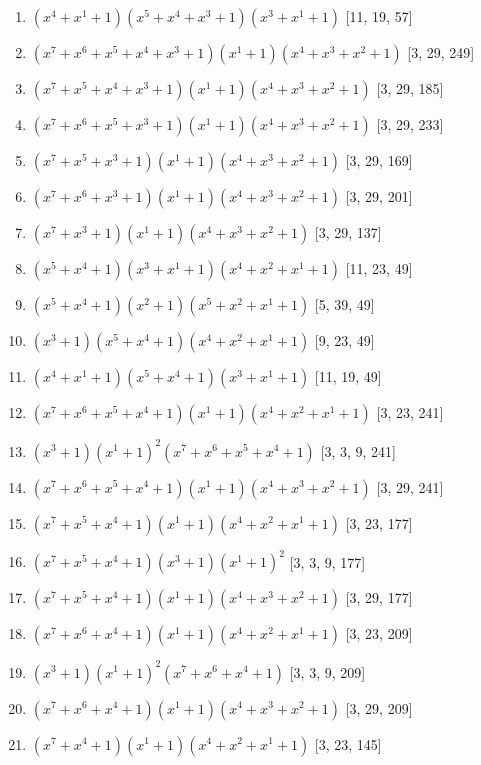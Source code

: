 \documentclass[10pt,twocolumn]{article}
\begin{document}
\begin{enumerate}
\item $(x^{4} + x^{1} + 1)(x^{5} + x^{4} + x^{3} + 1)(x^{3} + x^{1} + 1)$  [11, 19, 57]
\item $(x^{7} + x^{6} + x^{5} + x^{4} + x^{3} + 1)(x^{1} + 1)(x^{4} + x^{3} + x^{2} + 1)$  [3, 29, 249]
\item $(x^{7} + x^{5} + x^{4} + x^{3} + 1)(x^{1} + 1)(x^{4} + x^{3} + x^{2} + 1)$  [3, 29, 185]
\item $(x^{7} + x^{6} + x^{5} + x^{3} + 1)(x^{1} + 1)(x^{4} + x^{3} + x^{2} + 1)$  [3, 29, 233]
\item $(x^{7} + x^{5} + x^{3} + 1)(x^{1} + 1)(x^{4} + x^{3} + x^{2} + 1)$  [3, 29, 169]
\item $(x^{7} + x^{6} + x^{3} + 1)(x^{1} + 1)(x^{4} + x^{3} + x^{2} + 1)$  [3, 29, 201]
\item $(x^{7} + x^{3} + 1)(x^{1} + 1)(x^{4} + x^{3} + x^{2} + 1)$  [3, 29, 137]
\item $(x^{5} + x^{4} + 1)(x^{3} + x^{1} + 1)(x^{4} + x^{2} + x^{1} + 1)$  [11, 23, 49]
\item $(x^{5} + x^{4} + 1)(x^{2} + 1)(x^{5} + x^{2} + x^{1} + 1)$  [5, 39, 49]
\item $(x^{3} + 1)(x^{5} + x^{4} + 1)(x^{4} + x^{2} + x^{1} + 1)$  [9, 23, 49]
\item $(x^{4} + x^{1} + 1)(x^{5} + x^{4} + 1)(x^{3} + x^{1} + 1)$  [11, 19, 49]
\item $(x^{7} + x^{6} + x^{5} + x^{4} + 1)(x^{1} + 1)(x^{4} + x^{2} + x^{1} + 1)$  [3, 23, 241]
\item $(x^{3} + 1)(x^{1} + 1)^{2}(x^{7} + x^{6} + x^{5} + x^{4} + 1)$  [3, 3, 9, 241]
\item $(x^{7} + x^{6} + x^{5} + x^{4} + 1)(x^{1} + 1)(x^{4} + x^{3} + x^{2} + 1)$  [3, 29, 241]
\item $(x^{7} + x^{5} + x^{4} + 1)(x^{1} + 1)(x^{4} + x^{2} + x^{1} + 1)$  [3, 23, 177]
\item $(x^{7} + x^{5} + x^{4} + 1)(x^{3} + 1)(x^{1} + 1)^{2}$  [3, 3, 9, 177]
\item $(x^{7} + x^{5} + x^{4} + 1)(x^{1} + 1)(x^{4} + x^{3} + x^{2} + 1)$  [3, 29, 177]
\item $(x^{7} + x^{6} + x^{4} + 1)(x^{1} + 1)(x^{4} + x^{2} + x^{1} + 1)$  [3, 23, 209]
\item $(x^{3} + 1)(x^{1} + 1)^{2}(x^{7} + x^{6} + x^{4} + 1)$  [3, 3, 9, 209]
\item $(x^{7} + x^{6} + x^{4} + 1)(x^{1} + 1)(x^{4} + x^{3} + x^{2} + 1)$  [3, 29, 209]
\item $(x^{7} + x^{4} + 1)(x^{1} + 1)(x^{4} + x^{2} + x^{1} + 1)$  [3, 23, 145]

\end{enumerate}
\end{document}
